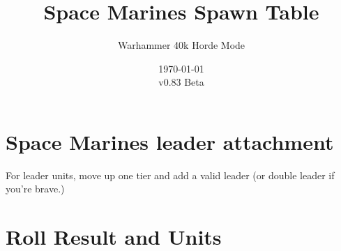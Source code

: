 \documentclass{HordeModeTarot}
\title{Space Marines Spawn Table}
\author{Warhammer 40k Horde Mode}
\date{\today \\v0.83 Beta}
\begin{document}
\maketitle

\section{Space Marines leader attachment}\hypertarget{special-rule}{}\label{special-rule}

For leader units, move up one tier and add a valid leader (or double leader if you're brave.)
\outputUsingSpawnTableBoilerplate

\section{Roll Result and Units}\hypertarget{roll-results}{}\label{roll-results}
\end{document}
